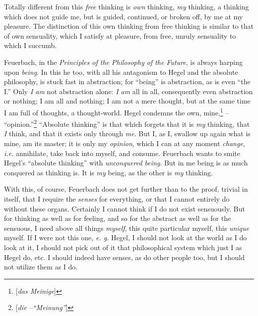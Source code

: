 \documentclass[12pt,a4paper]{book}
\begin{document}
Totally different from this \textit{free} thinking is \textit{own} thinking, 
\textit{my} thinking, a thinking which does not guide me, but is guided, 
continued, or broken off, by me at my pleasure. The distinction of this own 
thinking from free thinking is similar to that of own sensuality, which I 
satisfy at pleasure, from free, unruly sensuality to which I succumb.

Feuerbach, in the \textit{Principles of the Philosophy of the Future}, is 
always harping upon \textit{being}. In this he too, with all his antagonism to 
Hegel and the absolute philosophy, is stuck fast in abstraction; for 
``being'' is abstraction, as is even ``the I.'' Only \textit{I am} not 
abstraction alone: \textit{I am} all in all, consequently even abstraction or 
nothing; I am all and nothing; I am not a mere thought, but at the same time I 
am full of thoughts, a thought-world. Hegel condemns the own, 
mine,\footnote{[\textit{das Meinige}]} -- ``opinion.''\footnote{[\textit{die 
--``Meinung''}]} ``Absolute thinking'' is that which forgets that it is 
\textit{my} thinking, that \textit{I} think, and that it exists only through 
\textit{me}. But I, as I, swallow up again what is mine, am its master; it is 
only my \textit{opinion}, which I can at any moment \textit{change}, 
\textit{i.e.} annihilate, take back into myself, and consume. Feuerbach wants 
to smite Hegel's ``absolute thinking'' with \textit{unconquered being}. But 
in me being is as much conquered as thinking is. It is \textit{my} being, as 
the other is \textit{my} thinking.

With this, of course, Feuerbach does not get further than to the proof, 
trivial in itself, that I require the \textit{senses} for everything, or that 
I cannot entirely do without these organs. Certainly I cannot think if I do 
not exist sensuously. But for thinking as well as for feeling, and so for the 
abstract as well as for the sensuous, I need above all things \textit{myself}, 
this quite particular myself, this \textit{unique} myself. If I were not this 
one, \textit{e. g.} Hegel, I should not look at the world as I do look at it, 
I should not pick out of it that philosophical system which just I as Hegel 
do, etc. I should indeed have senses, as do other people too, but I should not 
utilize them as I do.
\end{document}
